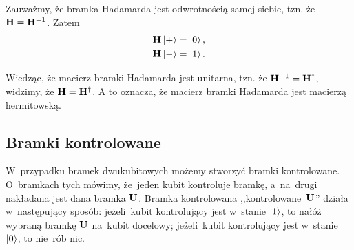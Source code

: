 Zauważmy, że bramka Hadamarda jest odwrotnością samej siebie, tzn. że $\mathbf{H} = \mathbf{H}^{-1}$. Zatem
$$
	\begin{aligned}
		\mathbf{H} \ket{+} = \ket{0}, \\
		\mathbf{H} \ket{-} = \ket{1}.
	\end{aligned}
$$

Wiedząc, że macierz bramki Hadamarda jest unitarna, tzn. że
$\mathbf{H}^{-1}=\mathbf{H}^\dagger$, widzimy, że $\mathbf{H}=\mathbf{H}^\dagger$. A
to oznacza, że macierz bramki Hadamarda jest macierzą
hermitowską.

\subsection{Bramki kontrolowane} W~przypadku bramek dwukubitowych możemy
stworzyć bramki kontrolowane. O~bramkach tych mówimy, że~jeden kubit
kontroluje bramkę, a~na~drugi nakładana jest dana bramka
$\mathbf{U}$. Bramka kontrolowana ,,kontrolowane~$\mathbf{U}$'' działa
w~następujący sposób: jeżeli~kubit kontrolujący jest w~stanie $\ket{1}$, to nałóż
wybraną bramkę $\mathbf{U}$ na~kubit docelowy;
jeżeli~kubit kontrolujący jest w~stanie $\ket{0}$, to nie~rób nic.

